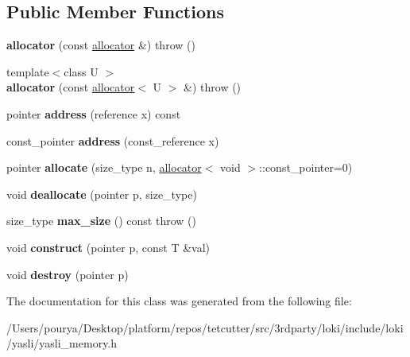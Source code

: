 \subsection*{Public Member Functions}
\begin{DoxyCompactItemize}
\item 
\hypertarget{classyasli_1_1allocator_affdd7027b51c8609bfbcc21943a27a94}{}{\bfseries allocator} (const \hyperlink{classyasli_1_1allocator}{allocator} \&)  throw ()\label{classyasli_1_1allocator_affdd7027b51c8609bfbcc21943a27a94}

\item 
\hypertarget{classyasli_1_1allocator_a21cea7a81458595c2239b4c4c6eae52e}{}{\footnotesize template$<$class U $>$ }\\{\bfseries allocator} (const \hyperlink{classyasli_1_1allocator}{allocator}$<$ U $>$ \&)  throw ()\label{classyasli_1_1allocator_a21cea7a81458595c2239b4c4c6eae52e}

\item 
\hypertarget{classyasli_1_1allocator_a4b2984a137883c8a6952a8cdde41ca7d}{}pointer {\bfseries address} (reference x) const \label{classyasli_1_1allocator_a4b2984a137883c8a6952a8cdde41ca7d}

\item 
\hypertarget{classyasli_1_1allocator_acfbb6822565ddb0b59a864e00815f457}{}const\+\_\+pointer {\bfseries address} (const\+\_\+reference x)\label{classyasli_1_1allocator_acfbb6822565ddb0b59a864e00815f457}

\item 
\hypertarget{classyasli_1_1allocator_a7d7c5bfc2f7ff4b37a346e2b0911d760}{}pointer {\bfseries allocate} (size\+\_\+type n, \hyperlink{classyasli_1_1allocator}{allocator}$<$ void $>$\+::const\+\_\+pointer=0)\label{classyasli_1_1allocator_a7d7c5bfc2f7ff4b37a346e2b0911d760}

\item 
\hypertarget{classyasli_1_1allocator_a36c98d3dc33b6fc1becc44b9edd44dda}{}void {\bfseries deallocate} (pointer p, size\+\_\+type)\label{classyasli_1_1allocator_a36c98d3dc33b6fc1becc44b9edd44dda}

\item 
\hypertarget{classyasli_1_1allocator_aceaa5541bc1d4334cb21266b7a027196}{}size\+\_\+type {\bfseries max\+\_\+size} () const   throw ()\label{classyasli_1_1allocator_aceaa5541bc1d4334cb21266b7a027196}

\item 
\hypertarget{classyasli_1_1allocator_aa6369a03f8aa87331f9b7ae0557370f9}{}void {\bfseries construct} (pointer p, const T \&val)\label{classyasli_1_1allocator_aa6369a03f8aa87331f9b7ae0557370f9}

\item 
\hypertarget{classyasli_1_1allocator_a1e2edc07973a55038a4e74c4b4f5ba6b}{}void {\bfseries destroy} (pointer p)\label{classyasli_1_1allocator_a1e2edc07973a55038a4e74c4b4f5ba6b}

\end{DoxyCompactItemize}


The documentation for this class was generated from the following file\+:\begin{DoxyCompactItemize}
\item 
/\+Users/pourya/\+Desktop/platform/repos/tetcutter/src/3rdparty/loki/include/loki/yasli/yasli\+\_\+memory.\+h\end{DoxyCompactItemize}
